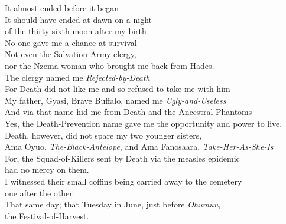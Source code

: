 \begin{refsection}
\noindent It almost ended before it began\\
It should have ended at dawn on a night\\
\hspace*{10mm}of the thirty-sixth moon after my birth\\
No one gave me a chance at survival\\
Not even the Salvation Army clergy,\\
\hspace*{10mm}nor the Nzema woman who brought me back from Hades.\\
The clergy named me \textit{Rejected-by-Death}\\
For Death did not like me and so refused to take me with him\\
My father, Gyasi, Brave Buffalo, named me \textit{Ugly-and-Useless}\\
And via that name hid me from Death and the Ancestral Phantoms\\
Yes, the Death-Prevention name gave me the opportunity and power to live.\\
Death, however, did not spare my two younger sisters, \\
Ama Oyuo, \textit{The-Black-Antelope}, and Ama Fanosaara, \textit{Take-Her-As-She-Is} \\
For, the Squad-of-Killers sent by Death via the measles epidemic\\
\hspace*{10mm}had no mercy on them.\\
\newpage
\noindent I witnessed their small coffins being carried away to the cemetery\\
\hspace*{10mm}one after the other \\
\noindent That same day; that Tuesday in June, just before \textit{Ohumuu},\\
\hspace*{10mm}the Festival-of-Harvest. \\


\end{refsection}
